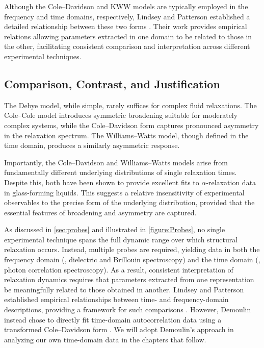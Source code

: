 Although the Cole--Davidson and KWW models are typically employed in the frequency and time domains, respectively, Lindsey and Patterson established a detailed relationship between these two forms \cite{Lindsey}. Their work provides empirical relations allowing parameters extracted in one domain to be related to those in the other, facilitating consistent comparison and interpretation across different experimental techniques.

\subsection{Comparison, Contrast, and Justification}

The Debye model, while simple, rarely suffices for complex fluid relaxations. The Cole--Cole model introduces symmetric broadening suitable for moderately complex systems, while the Cole--Davidson form captures pronounced asymmetry in the relaxation spectrum. The Williams--Watts model, though defined in the time domain, produces a similarly asymmetric response.

Importantly, the Cole--Davidson and Williams--Watts models arise from fundamentally different underlying distributions of single relaxation times. Despite this, both have been shown to provide excellent fits to $\alpha$-relaxation data in glass-forming liquids. This suggests a relative insensitivity of experimental observables to the precise form of the underlying distribution, provided that the essential features of broadening and asymmetry are captured.

As discussed in \sect\nolinebreak\ref{sec:probes} and illustrated in \fig\nolinebreak\ref{figure:Probes}, no single experimental technique spans the full dynamic range over which structural relaxation occurs. Instead, multiple probes are required, yielding data in both the frequency domain (\eg, dielectric and Brillouin spectroscopy) and the time domain (\eg, photon correlation spectroscopy). As a result, consistent interpretation of relaxation dynamics requires that parameters extracted from one representation be meaningfully related to those obtained in another. Lindsey and Patterson established empirical relationships between time- and frequency-domain descriptions, providing a framework for such comparisons \cite{Lindsey}. However, Demoulin instead chose to directly fit time-domain autocorrelation data using a transformed Cole--Davidson form \cite{Demoulin}. We will adopt Demoulin's approach in analyzing our own time-domain data in the chapters that follow.

